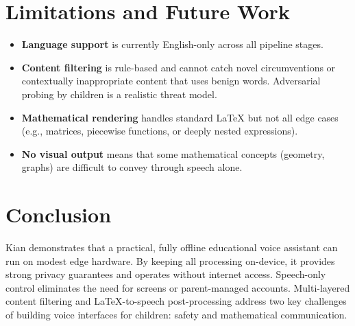 \documentclass[11pt]{article}
\begin{document}
\section{Limitations and Future Work}

\begin{itemize}[nosep]
  \item \textbf{Language support} is currently English-only across all pipeline stages.
  \item \textbf{Content filtering} is rule-based and cannot catch novel circumventions or contextually inappropriate content that uses benign words. Adversarial probing by children is a realistic threat model.
  \item \textbf{Mathematical rendering} handles standard LaTeX but not all edge cases (e.g., matrices, piecewise functions, or deeply nested expressions).
  \item \textbf{No visual output} means that some mathematical concepts (geometry, graphs) are difficult to convey through speech alone.
\end{itemize}

\section{Conclusion}

Kian demonstrates that a practical, fully offline educational voice assistant can run on modest edge hardware. By keeping all processing on-device, it provides strong privacy guarantees and operates without internet access. Speech-only control eliminates the need for screens or parent-managed accounts. Multi-layered content filtering and LaTeX-to-speech post-processing address two key challenges of building voice interfaces for children: safety and mathematical communication.
\end{document}

